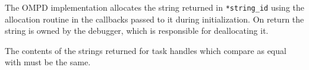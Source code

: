 The OMPD implementation allocates the string returned in \texttt{*string\_id}
using the allocation routine in the callbacks passed to it
during initialization.
On return the string is owned by the debugger, which is responsible
for deallocating it.

The contents of the strings returned for task handles
which compare as equal with
must be the same.